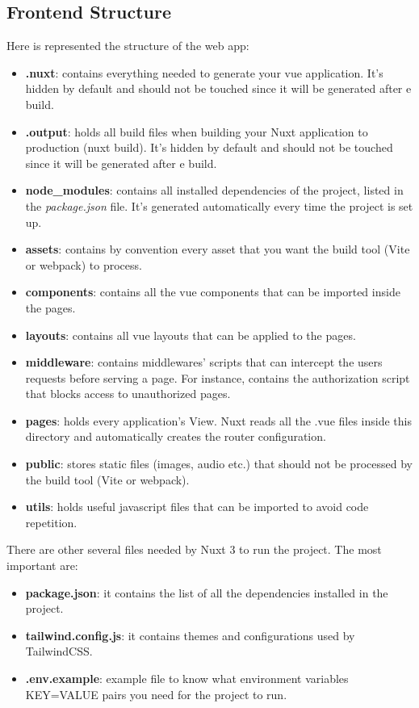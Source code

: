 \documentclass[table, 12pt]{article}
\begin{document}
\subsection{Frontend Structure}

Here is represented the structure of the web app:
\begin{itemize}
    \item \textbf{.nuxt}: contains everything needed to generate your vue application. It's hidden by default and should not be touched since it will be generated after e build.
    \item \textbf{.output}: holds all build files when building your Nuxt application to production (nuxt build). It's hidden by default and should not be touched since it will be generated after e build.
    \item \textbf{node\_modules}: contains all installed dependencies of the project, listed in the \textit{package.json} file.
    It's generated automatically every time the project is set up.
    \item \textbf{assets}: contains by convention every asset that you want the build tool (Vite or webpack) to process.
    \item \textbf{components}: contains all the vue components that can be imported inside the pages.
    \item \textbf{layouts}: contains all vue layouts that can be applied to the pages.
    \item \textbf{middleware}: contains middlewares' scripts that can intercept the users requests before serving a page. For instance, contains the authorization script that blocks access to unauthorized pages. 
    \item \textbf{pages}: holds every application's View. Nuxt reads all the .vue files inside this directory and automatically creates the router configuration.
    \item \textbf{public}: stores static files (images, audio etc.) that should not be processed by the build tool (Vite or webpack). 
    \item \textbf{utils}: holds useful javascript files that can be imported to avoid code repetition.

\end{itemize}

There are other several files needed by Nuxt 3 to run the project. The most important are:
\begin{itemize}
    \item \textbf{package.json}: it contains the list of all the dependencies installed in the project.
    \item \textbf{tailwind.config.js}: it contains themes and configurations used by TailwindCSS.
    \item \textbf{.env.example}: example file to know what environment variables KEY=VALUE pairs you need for the project to run.
\end{itemize}
\end{document}
